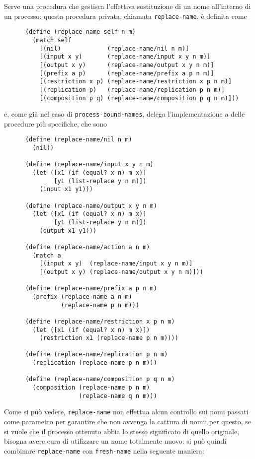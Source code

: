 Serve una procedura che gestisca l'effettiva sostituzione di un nome
all'interno di un processo: questa procedura privata, chiamata
\lstinline{replace-name}, \`e definita come

\begin{lstlisting}
      (define (replace-name self n m)
        (match self
          [(nil)             (replace-name/nil n m)]
          [(input x y)       (replace-name/input x y n m)]
          [(output x y)      (replace-name/output x y n m)]
          [(prefix a p)      (replace-name/prefix a p n m)]
          [(restriction x p) (replace-name/restriction x p n m)]
          [(replication p)   (replace-name/replication p n m)]
          [(composition p q) (replace-name/composition p q n m)]))
\end{lstlisting}

e, come gi\`a nel caso di \lstinline{process-bound-names}, delega
l'implementazione a delle procedure pi\`u specifiche, che sono

\begin{lstlisting}
      (define (replace-name/nil n m)
        (nil))

      (define (replace-name/input x y n m)
        (let ([x1 (if (equal? x n) m x)]
              [y1 (list-replace y n m)])
          (input x1 y1)))

      (define (replace-name/output x y n m)
        (let ([x1 (if (equal? x n) m x)]
              [y1 (list-replace y n m)])
          (output x1 y1)))

      (define (replace-name/action a n m)
        (match a
          [(input x y)  (replace-name/input x y n m)]
          [(output x y) (replace-name/output x y n m)]))

      (define (replace-name/prefix a p n m)
        (prefix (replace-name a n m)
                (replace-name p n m)))

      (define (replace-name/restriction x p n m)
        (let ([x1 (if (equal? x n) m x)])
          (restriction x1 (replace-name p n m))))

      (define (replace-name/replication p n m)
        (replication (replace-name p n m)))

      (define (replace-name/composition p q n m)
        (composition (replace-name p n m)
                     (replace-name q n m)))
\end{lstlisting}

Come si pu\`o vedere, \lstinline{replace-name} non effettua alcun
controllo sui nomi passati come parametro per garantire che non avvenga
la cattura di nomi; per questo, se si vuole che il processo ottenuto
abbia lo stesso significato di quello originale, bisogna avere cura di
utilizzare un nome totalmente nuovo: si pu\`o quindi combinare
\lstinline{replace-name} con \lstinline{fresh-name} nella seguente
maniera:

